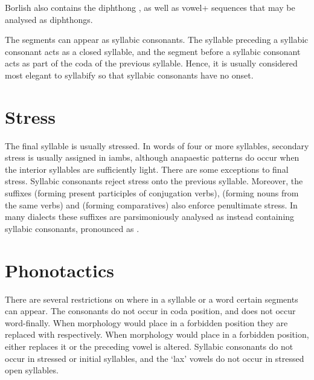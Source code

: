 Borlish also contains the diphthong , as well as vowel+ sequences that may be analysed as diphthongs. 

The segments  can appear as syllabic consonants.
The syllable preceding a syllabic consonant acts as a closed syllable, and the segment before a syllabic consonant acts as part of the coda of the previous syllable. Hence, it is usually considered most elegant to syllabify so that syllabic consonants have no onset.

\section{Stress}\label{sec:stress}
The final syllable is usually stressed.
In words of four or more syllables, secondary stress is usually assigned in iambs, although anapaestic patterns do occur when the interior syllables are sufficiently light.
There are some exceptions to final stress. Syllabic consonants reject stress onto the previous syllable. Moreover, the suffixes  (forming present participles of  conjugation verbs),  (forming nouns from the same verbs) and  (forming comparatives) also enforce penultimate stress.
In many dialects these suffixes are parsimoniously analysed as instead containing syllabic consonants, pronounced as .

\section{Phonotactics}\label{sec:phonotactics}
There are several restrictions on where in a syllable or a word certain segments can appear. The consonants  do not occur in coda position, and  does not occur word-finally. When morphology would place  in a forbidden position they are replaced with  respectively.
    When morphology would place  in a forbidden position, either  replaces it or the preceding vowel is altered.
Syllabic consonants do not occur in stressed or initial syllables, and the `lax' vowels  do not occur in stressed open syllables.

